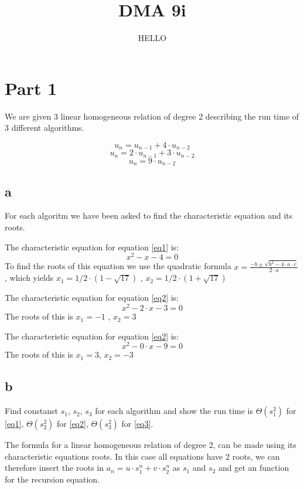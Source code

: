 \documentclass[a4paper]{article}
\title{DMA 9i}
\author{HELLO}
\begin{document}
\maketitle

\section*{Part 1}

We are given 3 linear homogeneous relation of degree 2 describing the run time of 3 different algorithms.

\begin{equation} \label{eq1} u_{n} = u_{n-1} + 4 \cdot u_{n-2} \end{equation}
\begin{equation} \label{eq2} u_{n} = 2 \cdot u_{n-1} + 3 \cdot u_{n-2} \end{equation}
\begin{equation} \label{eq3} u_{n} = 9 \cdot u_{n-2} \end{equation}
\subsection*{a}
For each algoritm we have been asked to find the characteristic equation and its roots.

The characteristic equation for equation \ref{eq1} is:
\[x^{2} - x - 4 = 0\]
To find the roots of this equation we use the quadratic formula
\(x=\frac{-b \pm \sqrt{b^2-4 \cdot a \cdot c}}{2 \cdot a} \)
, which yields
\(x_1 = 1/2 \cdot (1 - \sqrt{17})\) , \(x_2 = 1/2 \cdot (1 + \sqrt{17}) \)


The characteristic equation for equation \ref{eq2} is:
\[x^{2} - 2 \cdot x - 3 = 0\]
The roots of this is
\(x_1 = -1\) , \(x_2 = 3\)


The characteristic equation for equation \ref{eq2} is:
\[x^{2} - 0 \cdot x - 9 = 0\]
The roots of this is
\(x_1 = 3\), \(x_2 = -3\)

\subsection*{b}
Find constanst $s_1$, $s_2$, $s_3$ for each algorithm and show the run time is $\Theta (s_1^2)$ for \ref{eq1}, $\Theta (s_2^2)$ for \ref{eq2}, $\Theta (s_3^2)$  for \ref{eq3}.

The formula for a linear homogeneous relation of degree 2, can be made using its characteristic equations roots.
In this case all equations have 2 roots, we can therefore insert the roots in \(a_n=u \cdot s_1^n + v \cdot s_2^n\) as $s_1$ and $s_2$ and get an function for the recursion equation.
\end{document}
